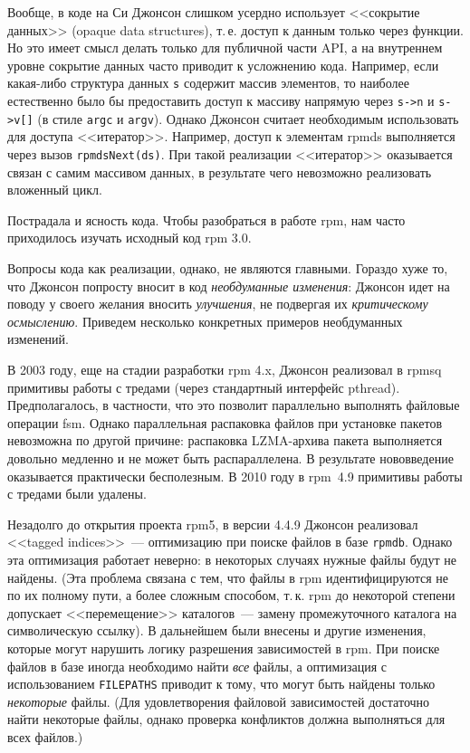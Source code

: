 \documentclass[russian,a4paper,12pt,titlepage]{article}
\begin{document}
Вообще, в коде на Си Джонсон слишком усердно использует <<сокрытие данных>> (opaque data structures), т.\,е. доступ к данным
только через функции.  Но это имеет смысл делать только для публичной части API, а на внутреннем уровне сокрытие данных
часто приводит к усложнению кода.  Например, если какая-либо структура данных \verb|s| содержит массив элементов, то наиболее
естественно было бы предоставить доступ к массиву напрямую через \verb|s->n| и \verb|s->v[]| (в стиле \verb|argc| и \verb|argv|).
Однако Джонсон считает необходимым использовать для доступа <<итератор>>.  Например, доступ к элементам rpmds выполняется
через вызов \verb|rpmdsNext(ds)|.  При такой реализации <<итератор>> оказывается связан с самим массивом данных, в результате
чего невозможно реализовать вложенный цикл.

Пострадала и ясность кода.  Чтобы разобраться в работе rpm, нам часто приходилось изучать исходный код rpm 3.0.

Вопросы кода как реализации, однако, не являются главными.  Гораздо хуже то, что Джонсон попросту вносит в код
\emph{необдуманные изменения}: Джонсон идет на поводу у своего желания вносить \emph{улучшения}, не подвергая
их \emph{критическому осмыслению}.  Приведем несколько конкретных примеров необдуманных изменений.

В 2003 году, еще на стадии разработки rpm 4.x, Джонсон реализовал в rpmsq примитивы работы с тредами (через
стандартный интерфейс pthread).  Предполагалось, в частности, что это позволит параллельно выполнять файловые
операции fsm.  Однако параллельная распаковка файлов при установке пакетов невозможна по другой причине: распаковка
LZMA-архива пакета выполняется довольно медленно и не может быть распараллелена.  В результате нововведение
оказывается практически бесполезным.  В 2010 году в rpm~4.9 примитивы работы с тредами были удалены.

Незадолго до открытия проекта rpm5, в версии 4.4.9 Джонсон реализовал <<tagged indices>>~--- оптимизацию
при поиске файлов в базе \verb|rpmdb|.  Однако эта оптимизация работает неверно: в некоторых случаях нужные файлы
будут не найдены.  (Эта проблема связана с тем, что файлы в rpm идентифицируются не по их полному пути, а более сложным
способом, т.\,к. rpm до некоторой степени допускает <<перемещение>> каталогов~--- замену промежуточного каталога на символическую ссылку).
В дальнейшем были внесены и другие изменения, которые могут нарушить логику разрешения
зависимостей в rpm.  При поиске файлов в базе иногда необходимо найти \emph{все} файлы, а оптимизация
с использованием \verb|FILEPATHS| приводит к тому, что могут быть найдены только \emph{некоторые} файлы.
(Для удовлетворения файловой зависимостей достаточно найти некоторые файлы, однако проверка конфликтов должна
выполняться для всех файлов.)
\end{document}
